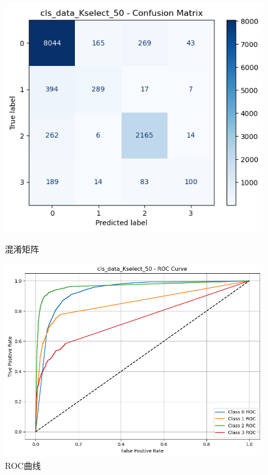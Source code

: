 \documentclass[10pt]{article}
\begin{document}
\begin{figure}[H]
\centering
\begin{minipage}[t]{0.45\textwidth}
  \centering
  \includegraphics[width=\linewidth]{cls_knn_50s.png}
  \caption{混淆矩阵}
  \label{fig:28}
\end{minipage}
\hfill
\begin{minipage}[t]{0.52\textwidth}
  \centering
  \includegraphics[width=\linewidth]{cls_knn_50s2.png}
  \caption{ROC曲线}
  \label{fig:29}
\end{minipage}
\end{figure}
\end{document}
